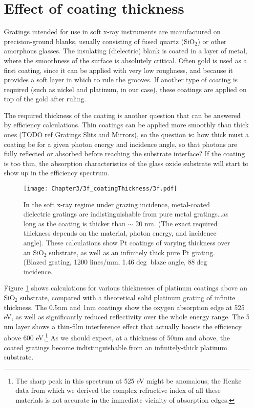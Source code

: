 \section{Effect of coating thickness}
Gratings intended for use in soft x-ray instruments are manufactured on precision-ground  blanks, usually consisting of fused quartz (SiO$_2$) or other amorphous glasses.  The insulating (dielectric) blank is coated in a layer of metal, where the smoothness of the surface is absolutely critical.  Often gold is used as a first coating, since it can be applied with very low roughness, and because it provides a soft layer in which to rule the grooves.  If another type of coating is required (such as nickel and platinum, in our case), these coatings are applied on top of the gold after ruling.

The required thickness of the coating is another question that can be answered by efficiency calculations.   Thin coatings can be applied more smoothly than thick ones (TODO ref Gratings Slits and Mirrors), so the question is: how thick must a coating be for a given photon energy and incidence angle, so that photons are fully reflected or absorbed before reaching the substrate interface?  If the coating is too thin, the absorption characteristics of the glass oxide substrate will start to show up in the efficiency spectrum.

\begin{figure}[htbp] %
   \centering
   \texttt{[image: Chapter3/3f\_coatingThickness/3f.pdf]} 
   \caption[In the soft x-ray regime under grazing incidence, metal-coated dielectric gratings are indistinguishable from pure metal gratings\ldots as long as the coating is thicker than $\sim$ 20 nm.]{In the soft x-ray regime under grazing incidence, metal-coated dielectric gratings are indistinguishable from pure metal gratings\ldots as long as the coating is thicker than $\sim$ 20 nm.  (The exact required thickness depends on the material, photon energy, and incidence angle).  These calculations show Pt coatings of varying thickness over an SiO$_2$ substrate, as well as an infinitely thick pure Pt grating.  (Blazed grating, 1200 lines/mm, 1.46$\deg$ blaze angle, 88$\deg$ incidence.}
   \label{3f}
\end{figure}

Figure \ref{3f} shows calculations for various thicknesses of platinum coatings above an SiO$_2$ substrate, compared with a theoretical solid platinum grating of infinite thickness.  The 0.5nm and 1nm coatings show the oxygen absorption edge at 525 eV, as well as significantly reduced reflectivity over the whole energy range.  The 5 nm layer shows a thin-film interference effect that actually boosts the efficiency above 600 eV.\footnote{The sharp peak in this spectrum at 525 eV might be anomalous; the Henke data from which we derived the complex refractive index of all these materials is not accurate in the immediate vicinity of absorption edges.}  As we should expect, at a thickness of 50nm and above, the coated gratings become indistinguishable from an infinitely-thick platinum substrate.  

